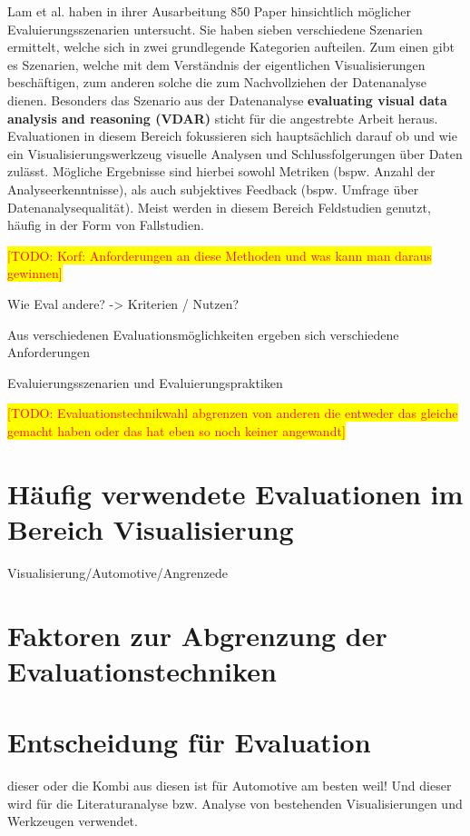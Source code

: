 \documentclass[draft=false
              ,paper=a4
              ,twoside=false
              ,fontsize=11pt
              ,headsepline
              ,BCOR10mm
              ,DIV11
              ]{scrbook}
\newcommand{\TODO}[1]{\colorbox{yellow}{\textcolor{red}{[TODO: #1]}}}
\begin{document}
Lam et al. haben in ihrer Ausarbeitung \cite{lam_empirical_2012} 850 Paper hinsichtlich möglicher Evaluierungsszenarien untersucht. Sie haben sieben verschiedene Szenarien ermittelt, welche sich in zwei grundlegende Kategorien aufteilen. Zum einen gibt es Szenarien, welche mit dem Verständnis der eigentlichen Visualisierungen beschäftigen, zum anderen solche die zum Nachvollziehen der Datenanalyse dienen. Besonders das Szenario aus der Datenanalyse \textbf{evaluating visual data analysis and reasoning (VDAR)} sticht für die angestrebte Arbeit heraus. Evaluationen in diesem Bereich fokussieren sich hauptsächlich darauf ob und wie ein Visualisierungswerkzeug visuelle Analysen und Schlussfolgerungen über Daten zulässt. Mögliche Ergebnisse sind hierbei sowohl Metriken (bspw. Anzahl der Analyseerkenntnisse), als auch subjektives Feedback (bspw. Umfrage über Datenanalysequalität). Meist werden in diesem Bereich Feldstudien genutzt, häufig in der Form von Fallstudien.

\TODO{Korf: Anforderungen an diese Methoden und was kann man daraus gewinnen}

Wie Eval andere? -> Kriterien / Nutzen?

Aus verschiedenen Evaluationsmöglichkeiten ergeben sich verschiedene Anforderungen

Evaluierungsszenarien und Evaluierungspraktiken

\TODO{Evaluationstechnikwahl abgrenzen von anderen die entweder das gleiche gemacht haben oder das hat eben so noch keiner angewandt}

\section{Häufig verwendete Evaluationen im Bereich Visualisierung} %
\label{sec:häufig_verwendete_Evaluationen im Bereich Visualisierung}
Visualisierung/Automotive/Angrenzede

\section{Faktoren zur Abgrenzung der Evaluationstechniken} %
\label{sec:Faktoren zur Abgrenzung der Evaluationstechniken}


\section{Entscheidung für Evaluation} %
\label{sec:entscheidung_für_Evaluation}
dieser oder die Kombi aus diesen ist für Automotive am besten weil! Und dieser wird für die Literaturanalyse bzw. Analyse von bestehenden Visualisierungen und Werkzeugen verwendet.
\end{document}
